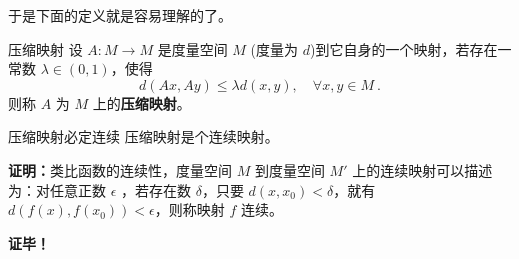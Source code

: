 于是下面的定义就是容易理解的了。
\begin{definition}{压缩映射}
设 $A:M\rightarrow M$ 是度量空间 $M$ (度量为 $d$)到它自身的一个映射，若存在一常数 $\lambda\in(0,1)$，使得
\begin{equation}
d(Ax,Ay)\leq \lambda d(x,y),\quad \forall x,y\in M~.
\end{equation}
 则称 $A$ 为 $M$ 上的\textbf{压缩映射}。
\end{definition}
\begin{theorem}{压缩映射必定连续}
压缩映射是个连续映射。
\end{theorem}
\textbf{证明：}类比函数的连续性，度量空间 $M$ 到度量空间 $M'$ 上的连续映射可以描述为：对任意正数 $\epsilon$ ，若存在数 $\delta$，只要 $d(x,x_0)<\delta$，就有 $d(f(x),f(x_0))<\epsilon$，则称映射 $f$ 连续。



\textbf{证毕！}